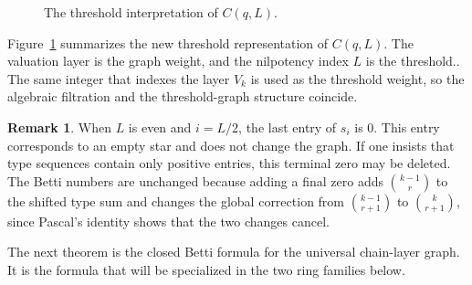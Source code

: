 \documentclass[12pt]{article}
\theoremstyle{definition}
\newtheorem{remark}[theorem]{Remark}
\begin{document}
\begin{figure}[H]
	\centering
	\caption{The threshold interpretation of $C(q,L)$.}
	\label{fig:threshold-block-diagram-reduced}
\end{figure}

\medskip

Figure~\ref{fig:threshold-block-diagram-reduced} summarizes the new threshold representation of $C(q,L)$. The valuation layer is the graph weight, and the nilpotency index $L$ is the threshold..  The same integer that indexes the layer $V_k$ is used as the threshold weight, so the algebraic filtration and the threshold-graph structure coincide.


\medskip
\begin{remark}\label{rem:zero-type}
	When $L$ is even and $i=L/2$, the last entry of $s_i$ is $0$.  This entry corresponds to an empty star and does not change the graph.  If one insists that type sequences contain only positive entries, this terminal zero may be deleted.  The Betti numbers are unchanged because adding a final zero adds $\binom{k-1}{r}$ to the shifted type sum and changes the global correction from $\binom{k-1}{r+1}$ to $\binom{k}{r+1}$, since Pascal's identity shows that the two changes cancel.
\end{remark}

\medskip

The next theorem is the  closed Betti formula for the universal chain-layer graph.  It is the formula that will be specialized in the two ring families below.

\medskip
\end{document}
